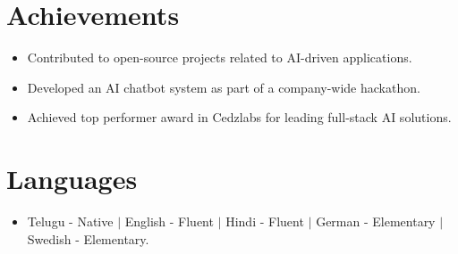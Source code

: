 \documentclass[letterpaper,11pt]{article}
\begin{document}
\section{Achievements}
\begin{itemize}
  \item Contributed to open-source projects related to AI-driven applications.
  \item Developed an AI chatbot system as part of a company-wide hackathon.
  \item Achieved top performer award in Cedzlabs for leading full-stack AI solutions.
\end{itemize}

\section*{Languages}
\begin{itemize}
  \item Telugu - Native $|$ English - Fluent $|$ Hindi - Fluent $|$ German - Elementary $|$ Swedish - Elementary.
\end{itemize}
\end{document}

